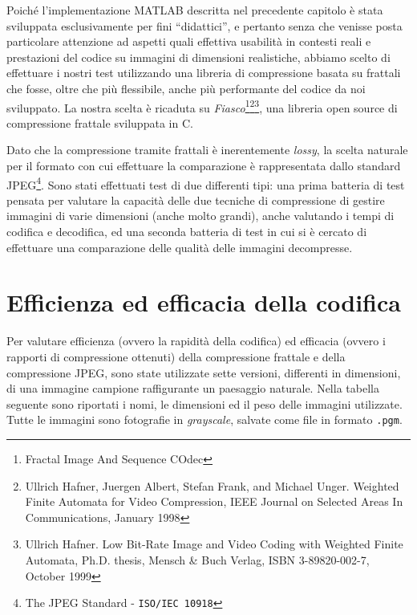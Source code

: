 \documentclass[11pt,a4paper,appendixprefix=true,numbers=noenddot]{scrreprt}
\begin{document}
Poiché l'implementazione MATLAB descritta nel precedente capitolo è stata sviluppata esclusivamente per fini ``didattici'', e pertanto senza che venisse posta particolare attenzione ad aspetti quali effettiva usabilità in contesti reali e prestazioni del codice su immagini di dimensioni realistiche, abbiamo scelto di effettuare i nostri test utilizzando una libreria di compressione basata su frattali che fosse, oltre che più flessibile, anche più performante del codice da noi sviluppato. La nostra scelta è ricaduta su \emph{Fiasco}\footnote{Fractal Image And Sequence COdec}\footnote{Ullrich Hafner, Juergen Albert, Stefan Frank, and Michael Unger.  Weighted Finite Automata for Video Compression, IEEE Journal on Selected Areas In Communications, January 1998}\footnote{Ullrich  Hafner.  Low Bit-Rate Image and Video Coding with Weighted Finite Automata, Ph.D. thesis, Mensch \& Buch Verlag, ISBN 3-89820-002-7, October 1999}, una libreria open source di compressione frattale sviluppata in C.

Dato che la compressione tramite frattali è inerentemente \emph{lossy}, la scelta naturale per il formato con cui effettuare la comparazione è rappresentata dallo standard JPEG\footnote{The JPEG Standard - \texttt{ISO/IEC 10918}}. Sono stati effettuati test di due differenti tipi: una prima batteria di test pensata per valutare la capacità delle due tecniche di compressione di gestire immagini di varie dimensioni (anche molto grandi), anche valutando i tempi di codifica e decodifica, ed una seconda batteria di test in cui si è cercato di effettuare una comparazione  delle qualità delle immagini decompresse. 

\section{ Efficienza ed efficacia della codifica }

Per valutare efficienza (ovvero la rapidità della codifica) ed efficacia (ovvero i rapporti di compressione ottenuti) della compressione frattale e della compressione JPEG, sono state utilizzate sette versioni, differenti in dimensioni, di una immagine campione raffigurante un paesaggio naturale. Nella tabella seguente sono riportati i nomi, le dimensioni ed il peso delle immagini utilizzate. Tutte le immagini sono fotografie in \emph{grayscale}, salvate come file in formato \texttt{.pgm}.
\end{document}
